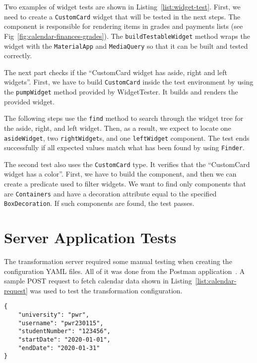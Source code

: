 Two examples of widget tests are shown in Listing~\ref{list:widget-test}. First, we need to create a \texttt{CustomCard} widget that will be tested in the next steps. The component is responsible for rendering items in grades and payments lists (see Fig~\ref{fig:calendar-finances-grades}). The \texttt{buildTestableWidget} method wraps the widget with the \texttt{MaterialApp} and \texttt{MediaQuery} so that it can be built and tested correctly.

The next part checks if the ``CustomCard widget has aside, right and left widgets''. First, we have to build \texttt{CustomCard} inside the test environment by using the \texttt{pumpWidget} method provided by WidgetTester. It builds and renders the provided widget.

The following steps use the \texttt{find} method to search through the widget tree for the aside, right, and left widget. Then, as a result, we expect to locate one \texttt{asideWidget}, two \texttt{rightWidget}s, and one \texttt{leftWidget} component. The test ends successfully if all expected values match what has been found by using \texttt{Finder}.

The second test also uses the \texttt{CustomCard} type. It verifies that the ``CustomCard widget has a color''. First, we have to build the component, and then we can create a predicate used to filter widgets. We want to find only components that are \texttt{Containers} and have a decoration attribute equal to the specified \texttt{BoxDecoration}. If such components are found, the test passes.



\section{Server Application Tests}
The transformation server required some manual testing when creating the configuration YAML files. All of it was done from the Postman application~\cite{postman}. A sample POST request to fetch calendar data shown in Listing~\ref{list:calendar-request} was used to test the transformation configuration.

\begin{lstlisting}[label=list:calendar-request,caption=Sample content of the POST request to fetch calendar data]
{
	"university": "pwr",
	"username": "pwr230115",
	"studentNumber": "123456",
	"startDate": "2020-01-01",
	"endDate": "2020-01-31"
}
\end{lstlisting}

